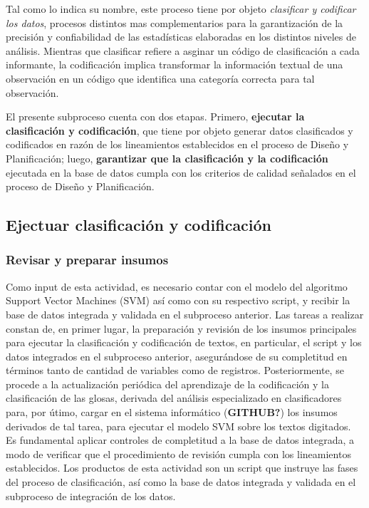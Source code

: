 \documentclass[
]{article}
\begin{document}
Tal como lo indica su nombre, este proceso tiene por objeto \emph{clasificar y codificar los datos}, procesos distintos mas complementarios para la garantización de la precisión y confiabilidad de las estadísticas elaboradas en los distintos niveles de análisis. Mientras que clasificar refiere a asginar un código de clasificación a cada informante, la codificación implica transformar la información textual de una observación en un código que identifica una categoría correcta para tal observación.

El presente subproceso cuenta con dos etapas. Primero, \textbf{ejecutar la clasificación y codificación}, que tiene por objeto generar datos clasificados y codificados en razón de los lineamientos establecidos en el proceso de Diseño y Planificación; luego, \textbf{garantizar que la clasificación y la codificación} ejecutada en la base de datos cumpla con los criterios de calidad señalados en el proceso de Diseño y Planificación.

\hypertarget{ejectuar-clasificaciuxf3n-y-codificaciuxf3n}{%
\subsection{Ejectuar clasificación y codificación}\label{ejectuar-clasificaciuxf3n-y-codificaciuxf3n}}

\hypertarget{revisar-y-preparar-insumos}{%
\subsubsection{Revisar y preparar insumos}\label{revisar-y-preparar-insumos}}

Como input de esta actividad, es necesario contar con el modelo del algoritmo Support Vector Machines (SVM) así como con su respectivo script, y recibir la base de datos integrada y validada en el subproceso anterior. Las tareas a realizar constan de, en primer lugar, la preparación y revisión de los insumos principales para ejecutar la clasificación y codificación de textos, en particular, el script y los datos integrados en el subproceso anterior, asegurándose de su completitud en términos tanto de cantidad de variables como de registros. Posteriormente, se procede a la actualización periódica del aprendizaje de la codificación y la clasificación de las glosas, derivada del análisis especializado en clasificadores para, por útimo, cargar en el sistema informático (\textbf{GITHUB?}) los insumos derivados de tal tarea, para ejecutar el modelo SVM sobre los textos digitados. Es fundamental aplicar controles de completitud a la base de datos integrada, a modo de verificar que el procedimiento de revisión cumpla con los lineamientos establecidos. Los productos de esta actividad son un script que instruye las fases del proceso de clasificación, así como la base de datos integrada y validada en el subproceso de integración de los datos.
\end{document}
